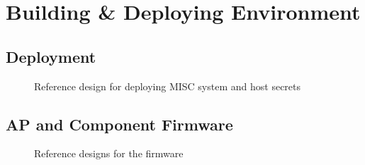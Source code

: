 \section{Building \& Deploying Environment}
\label{sec:build}

\subsection{Deployment}
\label{sec:deploy}

\iflong
\begin{figure}[H]
    \begin{center}
    \end{center}
    \caption{Reference design for deploying MISC system and host secrets}
    \label{fig:build-deployment}
\end{figure}
\fi



\subsection{AP and Component Firmware}
\label{sec:firmware}

\iflong
\begin{figure}[H]
    \begin{center}
    \end{center}
    \caption{Reference designs for the firmware}
    \label{fig:build-car-and-fobs}
\end{figure}
\fi

